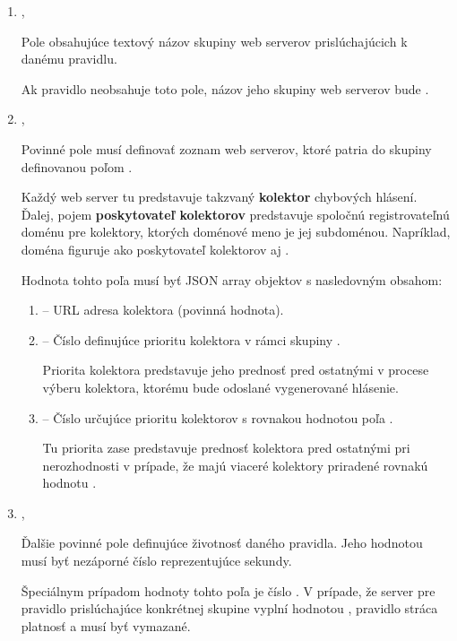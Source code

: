 \begin{enumerate}

    \item {},

    Pole obsahujúce textový názov skupiny web serverov prislúchajúcich k danému pravidlu.
    
    Ak pravidlo neobsahuje toto pole, názov jeho skupiny web serverov bude .
    
    \item {},

    Povinné pole  musí definovať zoznam web serverov, ktoré patria do skupiny definovanou poľom .
    
    Každý web server tu predstavuje takzvaný \textbf{kolektor} chybových hlásení.
    Ďalej, pojem \textbf{poskytovateľ kolektorov} predstavuje spoločnú registrovateľnú doménu pre kolektory, ktorých doménové meno je jej subdoménou.
    Napríklad, doména  figuruje ako poskytovateľ kolektorov  aj .
    
    Hodnota tohto poľa musí byť JSON array objektov s nasledovným obsahom:
    \begin{enumerate}
        \item {} -- URL adresa kolektora (povinná hodnota).
        \item {} -- Číslo definujúce prioritu kolektora v rámci skupiny .

        Priorita kolektora predstavuje jeho prednosť pred ostatnými v procese výberu kolektora, ktorému bude odoslané vygenerované hlásenie.
        
        \item {} -- Číslo určujúce prioritu kolektorov s rovnakou hodnotou poľa .

        Tu priorita zase predstavuje prednosť kolektora pred ostatnými pri nerozhodnosti v prípade, že majú viaceré kolektory priradené rovnakú hodnotu .
    \end{enumerate}
    
    \item {},

    Ďalšie povinné pole definujúce životnosť daného pravidla. Jeho hodnotou musí byť nezáporné číslo reprezentujúce sekundy.

    Špeciálnym prípadom hodnoty tohto poľa je číslo . 
    V prípade, že server pre pravidlo prislúchajúce konkrétnej skupine  vyplní  hodnotou , pravidlo stráca platnosť a musí byť vymazané.
    

\end{enumerate}

